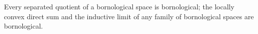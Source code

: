 Every separated quotient of a bornological space is bornological; the locally convex direct sum and the inductive limit of any family of bornological spaces are bornological.
